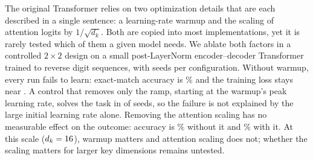 The original Transformer relies on two optimization details that are each described in a single sentence: a
learning-rate warmup and the scaling of attention logits by $1/\sqrt{d_k}$. Both are copied into most
implementations, yet it is rarely tested which of them a given model needs. We ablate both factors in a controlled
$2\times 2$ design on a small post-LayerNorm encoder--decoder Transformer trained to reverse digit sequences, with
\valSeeds{} seeds per configuration. Without warmup, every run fails to learn: exact-match accuracy is
\valAccNoWarmup\% and the training loss stays near \valPlateauLoss. A control that removes only the ramp, starting at the
warmup's peak learning rate, solves the task in \valRampSolved{} of \valRampRuns{} seeds, so the failure is not explained by
the large initial learning rate alone. Removing the attention scaling has no measurable
effect on the outcome: accuracy is \valAccNoScaling\% without it and \valAccBaseline\% with it. At this scale ($d_k=16$), warmup
matters and attention scaling does not; whether the scaling matters for larger key dimensions remains untested.
